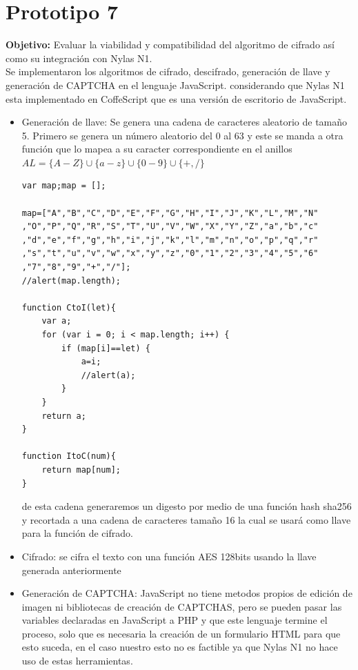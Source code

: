 \section{Prototipo 7}
\textbf{Objetivo:} Evaluar la viabilidad y compatibilidad del algoritmo de cifrado así como su integración con Nylas N1.\\
Se implementaron los algoritmos de cifrado, descifrado, generación de llave y generación de CAPTCHA en el lenguaje JavaScript. considerando que Nylas N1 esta implementado en CoffeScript que es una versión de escritorio de JavaScript.
\begin{itemize}
 \item Generación de llave: Se genera una cadena de caracteres aleatorio de tamaño 5. Primero se genera un número aleatorio del 0 al 63 y este se manda a otra función que lo mapea a su caracter correspondiente en el anillos $AL=\{A-Z\}\cup \{a-z\}\cup \{0-9\}\cup \{+,/\}$ 
 \begin{lstlisting}[frame=single]
  var map;map = [];
  
map=["A","B","C","D","E","F","G","H","I","J","K","L","M","N"
,"O","P","Q","R","S","T","U","V","W","X","Y","Z","a","b","c"
,"d","e","f","g","h","i","j","k","l","m","n","o","p","q","r"
,"s","t","u","v","w","x","y","z","0","1","2","3","4","5","6"
,"7","8","9","+","/"];
//alert(map.length);

function CtoI(let){
	var a;
	for (var i = 0; i < map.length; i++) {
		if (map[i]==let) {
			a=i;
			//alert(a);
		}
	}
	return a;
}

function ItoC(num){
	return map[num];
}
 \end{lstlisting}
 de esta cadena generaremos un digesto por medio de una función hash sha256 y recortada a una cadena de caracteres tamaño 16 la cual se usará como llave para la función de cifrado.
\item Cifrado: se cifra el texto con una función AES 128bits usando la llave generada anteriormente
\item Generación de CAPTCHA: JavaScript no tiene metodos propios de edición de imagen ni bibliotecas de creación de CAPTCHAS, pero se pueden pasar las variables declaradas en JavaScript a PHP y que este lenguaje termine el proceso, solo que es necesaria la creación de un formulario HTML para que esto suceda, en el caso nuestro esto no es factible ya que Nylas N1 no hace uso de estas herramientas.
\end{itemize}

